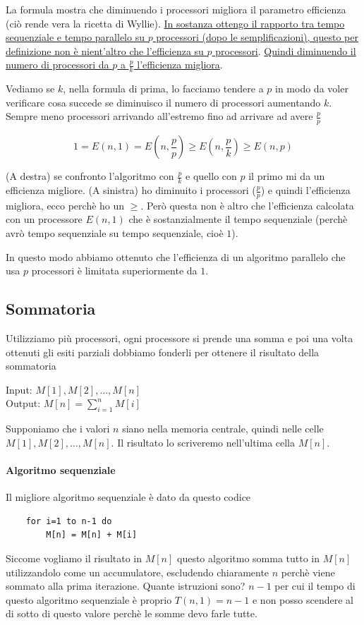 \begin{dimostrazione}
    La formula mostra che diminuendo i processori migliora il parametro efficienza (ciò rende vera la ricetta di Wyllie). \uline{In sostanza ottengo il rapporto tra tempo sequenziale e tempo parallelo su $p$ processori (dopo le semplificazioni), questo per definizione non è nient'altro che l'efficienza su $p$ processori}. \uline{Quindi diminuendo il numero di processori da $p$ a $\frac{p}{k}$ l'efficienza migliora}.

    Vediamo se $k$, nella formula di prima, lo facciamo tendere a $p$ in modo da voler verificare cosa succede se diminuisco il numero di processori aumentando $k$. Sempre meno processori arrivando all'estremo fino ad arrivare ad avere $\frac{p}{p}$

    $$1=E(n,1)=E(n,\frac{p}{p}) \geq E(n,\frac{p}{k}) \geq E(n,p)$$

    (A destra) se confronto l'algoritmo con $\frac{p}{k}$ e quello con $p$ il primo mi da un efficienza migliore. (A sinistra) ho diminuito i processori ($\frac{p}{p}$) e quindi l'efficienza migliora, ecco perchè ho un $\geq$. Però questa non è altro che l'efficienza calcolata con un processore $E(n,1)$ che è sostanzialmente il tempo sequenziale (perchè avrò tempo sequenziale su tempo sequenziale, cioè $1$).

    In questo modo abbiamo ottenuto che l'efficienza di un algoritmo parallelo che usa $p$ processori è limitata superiormente da $1$.
\end{dimostrazione}

\newpage


\subsection{Sommatoria}
Utilizziamo più processori, ogni processore si prende una somma e poi una volta ottenuti gli esiti parziali dobbiamo fonderli per ottenere il risultato della sommatoria

Input: $M[1], M[2], \dots , M[n]$\\
Output: $M[n] = \sum_{i=1}^n M[i]$

Supponiamo che i valori $n$ siano nella memoria centrale, quindi nelle celle $M[1], M[2], \dots , M[n]$. Il risultato lo scriveremo nell'ultima cella $M[n]$.

\paragraph{Algoritmo sequenziale}
Il migliore algoritmo sequenziale è dato da questo codice
\begin{lstlisting}
    for i=1 to n-1 do
        M[n] = M[n] + M[i]
\end{lstlisting}
Siccome vogliamo il risultato in $M[n]$ questo algoritmo somma tutto in $M[n]$ utilizzandolo come un accumulatore, escludendo chiaramente $n$ perchè viene sommato alla prima iterazione. Quante istruzioni sono? $n-1$ per cui il tempo di questo algoritmo sequenziale è proprio $T(n,1) = n-1$ e non posso scendere al di sotto di questo valore perchè le somme devo farle tutte.

